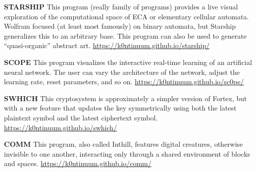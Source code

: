 \documentclass{article}
\renewcommand{\b}{\textbf}
\newcommand{\q}{\enquote}
\begin{document}
{{\b{STARSHIP} \quad This program (really family of programs) provides a live visual exploration of the computational space of ECA or elementary cellular automata. Wolfram focused (at least most famously) on binary automata, but Starship generalizes this to an arbitrary base. This program can also be used to generate \q{quasi-organic} abstract art. \quad \url{https://k0ntinuum.github.io/starship/}

\b{SCOPE} \quad This program visualizes the interactive real-time learning of an artificial neural network. The user can vary the architecture of the network, adjust the learning rate, reset parameters, and so on. \url{https://k0ntinuum.github.io/sc0pe/} 

\b{SWHICH} \quad This cryptosystem is approximately a simpler version of Fortex, but with a new feature that updates the key symmetrically using both the latest plaintext symbol and the latest ciphertext symbol.
\url{https://k0ntinuum.github.io/swhich/} 

\b{COMM} \quad This program, also called Inthill, features digital creatures, otherwise invisible to one another, interacting only through a shared environment of blocks and spaces. \url{https://k0ntinuum.github.io/comm/}





}}
\end{document}
